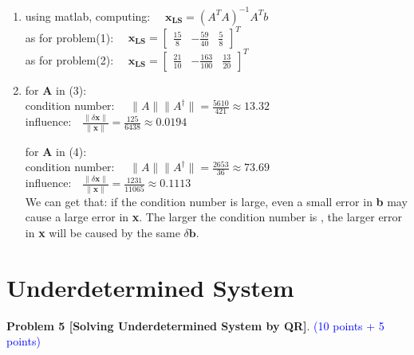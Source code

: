 \documentclass[english,onecolumn]{IEEEtran}
\begin{document}
\begin{enumerate}
    \item
    using matlab, computing:
    $\quad \mathbf{x_{LS}} = (A^T A)^{-1} A^T b $\\
    as for problem(1): $\quad \mathbf{x_{LS}} = \begin{bmatrix}
    \frac{15}{8} & -\frac{59}{40}  &  \frac{5}{8}  
    \end{bmatrix} ^T
    $\\
    as for problem(2): $\quad \mathbf{x_{LS}} = \begin{bmatrix}
    \frac{21}{10} & -\frac{163}{100}  &  \frac{13}{20}  
    \end{bmatrix} ^T
    $\\
    
    \item
    
    for $\mathbf{A}$ in (3):\\
    condition number: $\quad \|A\| \|A^{\dagger}\| = \frac{5610}{421} \approx 13.32 $ \\
    influence:$\quad \frac{\| \delta \mathbf{x} \|}{\| \mathbf{ x}\|} = \frac{125}{6438} \approx 0.0194 $
    
    for $\mathbf{A}$ in (4):\\
    condition number: $\quad \|A\| \|A^{\dagger}\| = \frac{2653}{36} \approx 73.69 $ \\
    influence:$\quad \frac{\| \delta \mathbf{x} \|}{\| \mathbf{ x}\|} = \frac{1231}{11065} \approx 0.1113 $\\
    
    We can get that: if the condition number is large, even a small error in {\bf b} may cause a large error in {\bf x}. The larger the condition number is , the larger error in {\bf x} will be caused by the same $\delta \mathbf{b}$.
    
\end{enumerate}


\newpage
\section{Underdetermined System}

\noindent\textbf{Problem 5 [Solving Underdetermined System by QR]}. \textcolor{blue}{(10 points + 5 points)}
\end{document}
